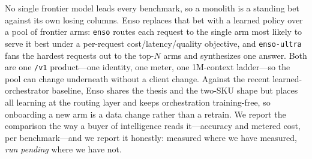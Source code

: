 \documentclass[11pt]{article}
\begin{document}
No single frontier model leads every benchmark, so a monolith is a standing bet
against its own losing columns. Enso replaces that bet with a learned policy over a
pool of frontier arms: \texttt{enso} routes each request to the single arm most
likely to serve it best under a per-request cost/latency/quality objective, and
\texttt{enso-ultra} fans the hardest requests out to the top-$N$ arms and
synthesizes one answer. Both are one \texttt{/v1} product---one identity, one meter,
one 1M-context ladder---so the pool can change underneath without a client change.
Against the recent learned-orchestrator baseline, Enso shares the thesis and
the two-SKU shape but places all learning at the routing layer and keeps
orchestration training-free, so onboarding a new arm is a data change rather than a
retrain. We report the comparison the way a buyer of intelligence reads it---accuracy
and metered cost, per benchmark---and we report it honestly: measured where we have
measured, \emph{run pending} where we have not.

{\small


}
\end{document}
